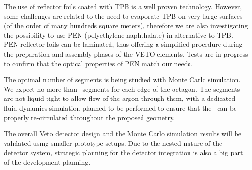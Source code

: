 The use of reflector foils coated with TPB is a well proven technology. However, some challenges are related to the need to evaporate TPB on very large surfaces  (of the order of many hundreds square meters), therefore we are also investigating the possibility to use PEN (polyethylene naphthalate) in alternative to TPB.  PEN  reflector foils can be laminated, thus offering a simplified procedure during the preparation and assembly phases of the VETO elements. Tests are in progress to confirm that  the optical properties of PEN match our needs.

The optimal number of segments is being studied with Monte Carlo simulation. We expect no more than \DSkVetoMaxSectorPerSide\ segments for each edge of the octagon. The segments are not liquid tight to allow flow of the argon through them, with a dedicated fluid-dynamics simulation planned to be performed to ensure that the \LAr\ can be properly re-circulated throughout the proposed geometry.

The overall Veto detector design and the Monte Carlo simulation results will be validated using smaller prototype setups.  Due to the nested nature of the detector system, strategic planning for the detector integration is also a big part of the development planning.

